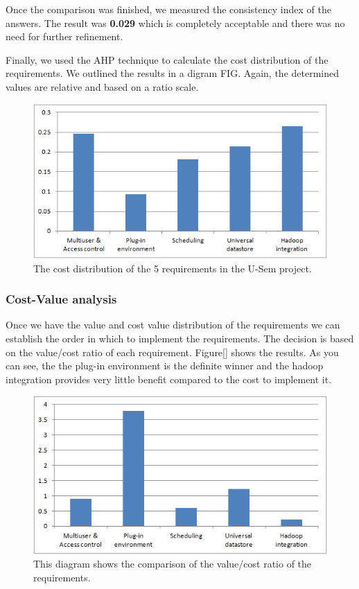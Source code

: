 Once the comparison was finished, we measured the consistency index of the answers. The result was \textbf{0.029} which is completely acceptable and there was no need for further refinement.

Finally, we used the AHP technique to calculate the cost distribution of the requirements. We outlined the results in a digram FIG. Again, the determined values are relative and based on a ratio scale. 

\begin{figure}[h!]
  \centering
  	\includegraphics{requirements/cost_diagram.png}
  \caption{The cost distribution of the 5 requirements in the U-Sem project.}
\end{figure}
 

\subsubsection{Cost-Value analysis}

Once we have the value and cost value distribution of the requirements we can establish the order in which to implement the requirements. The decision is based on the value/cost ratio of each requirement. Figure[] shows the results. As you can see, the the plug-in environment is the definite winner and the hadoop integration provides very little benefit compared to the cost to implement it.

\begin{figure}[h!]
  \centering
      \includegraphics{requirements/value_cost_diagram.png}
  \caption{This diagram shows the comparison of the value/cost ratio of the requirements.}
\end{figure}

